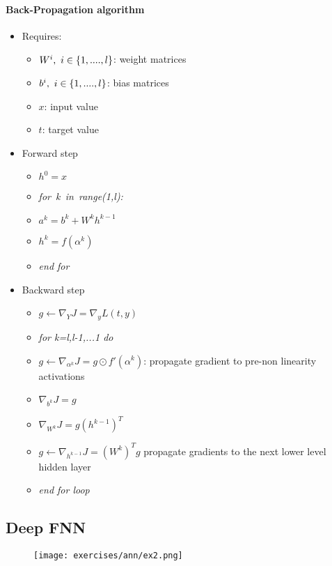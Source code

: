 \paragraph{Back-Propagation algorithm}
\begin{itemize}
\item Requires:
	\begin{itemize}
	\item $W^i,\ i\in \lbrace{1,....,l}\rbrace$: weight matrices
	\item $b^i,\ i\in \lbrace{1,....,l}\rbrace$: bias matrices
	\item $x$: input value
	\item $t$: target value
	\end{itemize}
\item Forward step

\begin{itemize}
\item $h^0=x$
\item \textit{for\ k\ in\ range(1,l):}
\item $a^k=b^k+W^kh^{k-1}$
\item $h^k=f(\alpha^k)$
\item \textit{end for}
\end{itemize}

\item Backward step

\begin{itemize}
	\item $g \leftarrow \nabla_YJ=\nabla_yL(t,y)$
	\item \textit{for k=l,l-1,...1 do}
	\item $g \leftarrow \nabla_{\alpha^k}J=g \odot f' (\alpha^k)$: propagate gradient to pre-non linearity activations
	\item $\nabla_{b^k}J=g$
	\item $\nabla_{W^k}J=g(h^{k-1})^T$
	\item $g \leftarrow \nabla_{h^{k-1}}J=(W^k)^Tg$ propagate gradients to the next lower level hidden layer
	\item \textit{end for loop}
\end{itemize}

\end{itemize}


\subsection{Deep FNN}

\begin{figure}[H]
    \centering
    \texttt{[image: exercises/ann/ex2.png]}
\end{figure}


